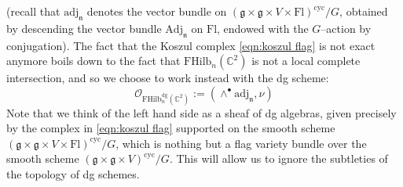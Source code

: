 \documentclass[12pt]{amsart}
\numberwithin{equation}{section}
\theoremstyle{definition}
\theoremstyle{remark}
\newcommand{\CC}{\mathbb{C}}
\newcommand{\CO}{\mathcal{O}}
\newcommand{\CT}{\mathcal{T}}
\renewcommand{\1}{\mathbf{1}}
\newcommand{\cyc}{\text{cyc}}
\newcommand{\fl}{\text{Fl}}
\newcommand{\FH}{\mathrm{FHilb}}
\newcommand{\fg}{\mathfrak{g}}
\newcommand{\fn}{\mathfrak{n}}
\newcommand{\dg}{\text{dg}}%
\newcommand{\Adj}{\mathrm{Adj}}
\newcommand{\adj}{\mathrm{adj}}
\begin{document}
(recall that $\adj_\fn$ denotes the vector bundle on $(\fg \times \fg \times V \times \fl)^\cyc/G$, obtained by descending the vector bundle $\Adj_\fn$ on $\fl$, endowed with the $G$--action by conjugation). The fact that the Koszul complex \eqref{eqn:koszul flag} is not exact anymore boils down to the fact that $\FH_n(\CC^2)$ is not a local complete intersection, and so we choose to work instead with the dg scheme:
\begin{equation}
\label{eqn:def dg zero}
\CO_{\FH_n^\dg(\CC^2)} := \left( \wedge^\bullet \adj_\fn, \nu \right)
\end{equation}
Note that we think of the left hand side as a sheaf of dg algebras, given precisely by the complex in \eqref{eqn:koszul flag} supported on the smooth scheme $(\fg \times \fg \times V \times \fl)^\cyc/G$, which is nothing but a flag variety bundle over the smooth scheme $(\fg \times \fg \times V)^\cyc/G$. This will allow us to ignore the subtleties of the topology of dg schemes.


\end{document}
